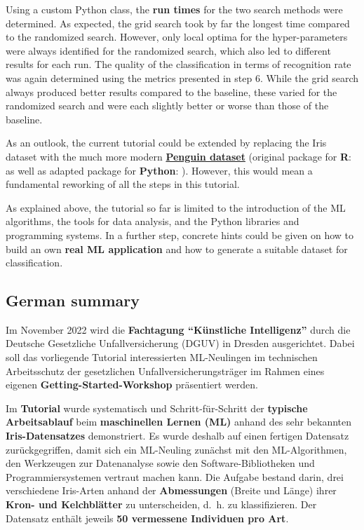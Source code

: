 \documentclass [oneside,10pt,a4paper,ngerman,BCOR10mm,headsepline,parindent,final]{scrartcl}
\begin{document}
Using a custom Python class, the \textbf{run times} for the two search
methods were determined. As expected, the grid search took by far the
longest time compared to the randomized search. However, only local
optima for the hyper-parameters were always identified for the
randomized search, which also led to different results for each run. The
quality of the classification in terms of recognition rate was again
determined using the metrics presented in step 6. While the grid search
always produced better results compared to the baseline, these varied
for the randomized search and were each slightly better or worse than
those of the baseline.

As an outlook, the current tutorial could be extended by replacing the
Iris dataset with the much more modern
\textbf{\href{https://github.com/mcnakhaee/palmerpenguins}{Penguin
dataset}} (original package for \textbf{R}: \cite{palmerpenguins_R_2020}
as well as adapted package for \textbf{Python}:
\cite{palmerpenguins_Python_2020}). However, this would mean a
fundamental reworking of all the steps in this tutorial.

As explained above, the tutorial so far is limited to the introduction
of the ML algorithms, the tools for data analysis, and the Python
libraries and programming systems. In a further step, concrete hints
could be given on how to build an own \textbf{real ML application} and
how to generate a suitable dataset for classification.

    \hypertarget{german-summary}{%
\subsection{German summary}\label{german-summary}}

Im November 2022 wird die \textbf{Fachtagung ``Künstliche Intelligenz''}
durch die Deutsche Gesetzliche Unfallversicherung (DGUV) in Dresden
ausgerichtet. Dabei soll das vorliegende Tutorial interessierten
ML-Neulingen im technischen Arbeitsschutz der gesetzlichen
Unfallversicherungsträger im Rahmen eines eigenen
\textbf{Getting-Started-Workshop} präsentiert werden.

Im \textbf{Tutorial} wurde systematisch und Schritt-für-Schritt der
\textbf{typische Arbeitsablauf} beim \textbf{maschinellen Lernen (ML)}
anhand des sehr bekannten \textbf{Iris-Datensatzes} demonstriert. Es
wurde deshalb auf einen fertigen Datensatz zurückgegriffen, damit sich
ein ML-Neuling zunächst mit den ML-Algorithmen, den Werkzeugen zur
Datenanalyse sowie den Software-Bibliotheken und Programmiersystemen
vertraut machen kann. Die Aufgabe bestand darin, drei verschiedene
Iris-Arten anhand der \textbf{Abmessungen} (Breite und Länge) ihrer
\textbf{Kron- und Kelchblätter} zu unterscheiden, d.~h. zu
klassifizieren. Der Datensatz enthält jeweils \textbf{50 vermessene
Individuen pro Art}.
\end{document}
